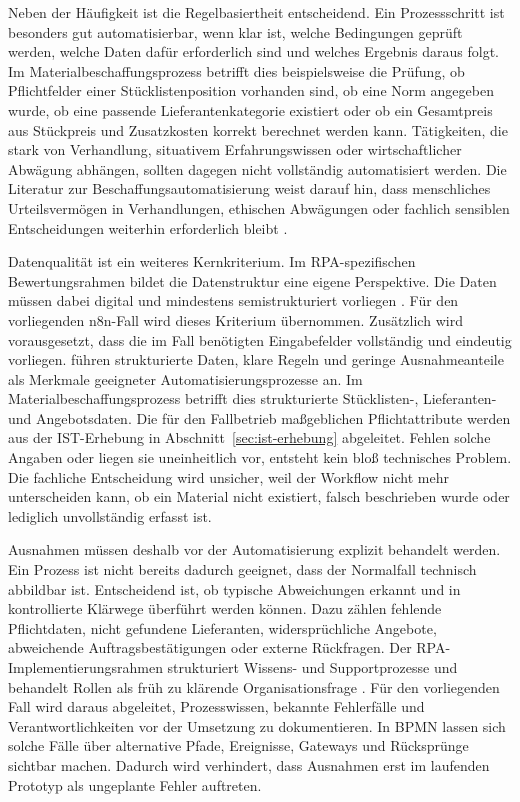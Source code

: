 \documentclass[a4paper,12pt]{article}
\begin{document}
Neben der Häufigkeit ist die Regelbasiertheit entscheidend. Ein Prozessschritt ist besonders gut automatisierbar, wenn klar ist, welche Bedingungen geprüft werden, welche Daten dafür erforderlich sind und welches Ergebnis daraus folgt. Im Materialbeschaffungsprozess betrifft dies beispielsweise die Prüfung, ob Pflichtfelder einer Stücklistenposition vorhanden sind, ob eine Norm angegeben wurde, ob eine passende Lieferantenkategorie existiert oder ob ein Gesamtpreis aus Stückpreis und Zusatzkosten korrekt berechnet werden kann. Tätigkeiten, die stark von Verhandlung, situativem Erfahrungswissen oder wirtschaftlicher Abwägung abhängen, sollten dagegen nicht vollständig automatisiert werden. Die Literatur zur Beschaffungsautomatisierung weist darauf hin, dass menschliches Urteilsvermögen in Verhandlungen, ethischen Abwägungen oder fachlich sensiblen Entscheidungen weiterhin erforderlich bleibt \parencite{santos_rebooting_2025}.

Datenqualität ist ein weiteres Kernkriterium. Im RPA-spezifischen Bewertungsrahmen bildet die Datenstruktur eine eigene Perspektive. Die Daten müssen dabei digital und mindestens semistrukturiert vorliegen \parencite{wellmann_framework_2020}. Für den vorliegenden n8n-Fall wird dieses Kriterium übernommen. Zusätzlich wird vorausgesetzt, dass die im Fall benötigten Eingabefelder vollständig und eindeutig vorliegen. \Textcite{moreira_business_2024} führen strukturierte Daten, klare Regeln und geringe Ausnahmeanteile als Merkmale geeigneter Automatisierungsprozesse an. Im Materialbeschaffungsprozess betrifft dies strukturierte Stücklisten-, Lieferanten- und Angebotsdaten. Die für den Fallbetrieb maßgeblichen Pflichtattribute werden aus der IST-Erhebung in Abschnitt~\ref{sec:ist-erhebung} abgeleitet. Fehlen solche Angaben oder liegen sie uneinheitlich vor, entsteht kein bloß technisches Problem. Die fachliche Entscheidung wird unsicher, weil der Workflow nicht mehr unterscheiden kann, ob ein Material nicht existiert, falsch beschrieben wurde oder lediglich unvollständig erfasst ist.

Ausnahmen müssen deshalb vor der Automatisierung explizit behandelt werden. Ein Prozess ist nicht bereits dadurch geeignet, dass der Normalfall technisch abbildbar ist. Entscheidend ist, ob typische Abweichungen erkannt und in kontrollierte Klärwege überführt werden können. Dazu zählen fehlende Pflichtdaten, nicht gefundene Lieferanten, widersprüchliche Angebote, abweichende Auftragsbestätigungen oder externe Rückfragen. Der RPA-Implementierungsrahmen strukturiert Wissens- und Supportprozesse und behandelt Rollen als früh zu klärende Organisationsfrage \parencite{herm_framework_2023}. Für den vorliegenden Fall wird daraus abgeleitet, Prozesswissen, bekannte Fehlerfälle und Verantwortlichkeiten vor der Umsetzung zu dokumentieren. In BPMN lassen sich solche Fälle über alternative Pfade, Ereignisse, Gateways und Rücksprünge sichtbar machen. Dadurch wird verhindert, dass Ausnahmen erst im laufenden Prototyp als ungeplante Fehler auftreten.
\end{document}
